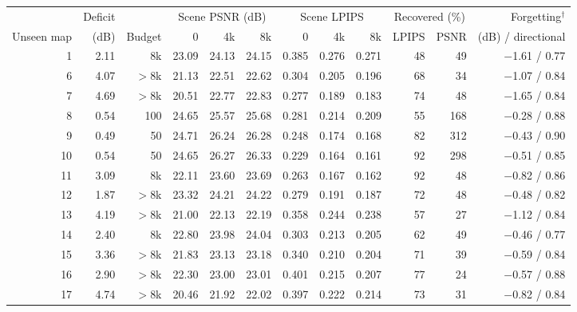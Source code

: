 \begin{tabular}{rrrrrrrrrrrr}
\toprule
& Deficit & & \multicolumn{3}{c}{Scene PSNR (dB)} & \multicolumn{3}{c}{Scene LPIPS} & \multicolumn{2}{c}{Recovered (\%)} & Forgetting$^\dagger$ \\
\cmidrule(lr){4-6}\cmidrule(lr){7-9}\cmidrule(lr){10-11}
Unseen map & (dB) & Budget & 0 & 4k & 8k & 0 & 4k & 8k & LPIPS & PSNR & (dB) / directional \\
\midrule
1 & 2.11 & 8k & 23.09 & 24.13 & 24.15 & 0.385 & 0.276 & 0.271 & 48 & 49 & $-$1.61 / 0.77 \\
6 & 4.07 & ${>}$8k & 21.13 & 22.51 & 22.62 & 0.304 & 0.205 & 0.196 & 68 & 34 & $-$1.07 / 0.84 \\
7 & 4.69 & ${>}$8k & 20.51 & 22.77 & 22.83 & 0.277 & 0.189 & 0.183 & 74 & 48 & $-$1.65 / 0.84 \\
8 & 0.54 & 100 & 24.65 & 25.57 & 25.68 & 0.281 & 0.214 & 0.209 & 55 & 168 & $-$0.28 / 0.88 \\
9 & 0.49 & 50 & 24.71 & 26.24 & 26.28 & 0.248 & 0.174 & 0.168 & 82 & 312 & $-$0.43 / 0.90 \\
10 & 0.54 & 50 & 24.65 & 26.27 & 26.33 & 0.229 & 0.164 & 0.161 & 92 & 298 & $-$0.51 / 0.85 \\
11 & 3.09 & 8k & 22.11 & 23.60 & 23.69 & 0.263 & 0.167 & 0.162 & 92 & 48 & $-$0.82 / 0.86 \\
12 & 1.87 & ${>}$8k & 23.32 & 24.21 & 24.22 & 0.279 & 0.191 & 0.187 & 72 & 48 & $-$0.48 / 0.82 \\
13 & 4.19 & ${>}$8k & 21.00 & 22.13 & 22.19 & 0.358 & 0.244 & 0.238 & 57 & 27 & $-$1.12 / 0.84 \\
14 & 2.40 & 8k & 22.80 & 23.98 & 24.04 & 0.303 & 0.213 & 0.205 & 62 & 49 & $-$0.46 / 0.77 \\
15 & 3.36 & ${>}$8k & 21.83 & 23.13 & 23.18 & 0.340 & 0.210 & 0.204 & 71 & 39 & $-$0.59 / 0.84 \\
16 & 2.90 & ${>}$8k & 22.30 & 23.00 & 23.01 & 0.401 & 0.215 & 0.207 & 77 & 24 & $-$0.57 / 0.88 \\
17 & 4.74 & ${>}$8k & 20.46 & 21.92 & 22.02 & 0.397 & 0.222 & 0.214 & 73 & 31 & $-$0.82 / 0.84 \\
\bottomrule
\end{tabular}
